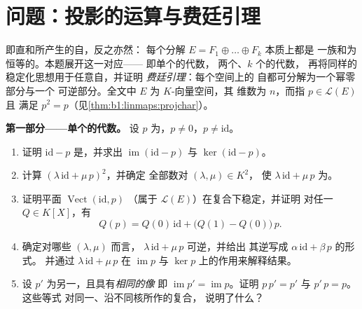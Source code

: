 \section{问题：投影的运算与费廷引理}

\begin{problem}\label{pb:b1:linmaps:1}
即直和所产生的自，反之亦然：
每个分解 $E = F_1 \oplus \dots \oplus F_k$ 本质上都是
一族和为恒等的。本题展开这一对应——
即单个的代数，
两个、$k$ 个的代数，
再将同样的稳定化思想用于任意自，并证明
\emph{费廷引理}：每个空间上的
自都可分解为一个幂零部分与一个
可逆部分。全文中 $E$ 为 $K$-向量空间，其
维数为 $n$，而\emph{}指 $p \in \mathcal{L}(E)$ 且
满足 $p^2 = p$（见\cref{thm:b1:linmaps:projchar}）。

\medskip
\noindent\textbf{第一部分——单个的代数。}
设 $p$ 为，$p \neq 0$，$p \neq \mathrm{id}$。
\begin{enumerate}
  \item 证明 $\mathrm{id} - p$ 是，并求出
        $\operatorname{im}(\mathrm{id} - p)$ 与
        $\ker(\mathrm{id} - p)$。
  \item 计算 $(\lambda\,\mathrm{id} + \mu\,p)^2$，并确定
        全部数对 $(\lambda, \mu) \in K^2$，
        使 $\lambda\,\mathrm{id} + \mu\,p$ 为。
  \item 证明平面 $\operatorname{Vect}(\mathrm{id}, p)$
        （属于 $\mathcal{L}(E)$）在复合下稳定，并证明
        对任一 $Q \in K[X]$，有
        \[
        Q(p) = Q(0)\,\mathrm{id} + \bigl(Q(1) -
        Q(0)\bigr)\,p .
        \]
  \item 确定对哪些 $(\lambda, \mu)$ 而言，
        $\lambda\,\mathrm{id} + \mu\,p$ 可逆，并给出
        其逆写成 $\alpha\,\mathrm{id} + \beta\,p$ 的形式。
        并通过
        $\lambda\,\mathrm{id} + \mu\,p$ 在 $\operatorname{im} p$
        与 $\ker p$ 上的作用来解释结果。
  \item 设 $p'$ 为另一，且具有\emph{相同的像}
        即 $\operatorname{im} p' = \operatorname{im} p$。证明
        $p\,p' = p'$ 与 $p'\,p = p$。这些等式
        对同一、沿不同核所作的复合，
        说明了什么？
\end{enumerate}


\end{problem}
